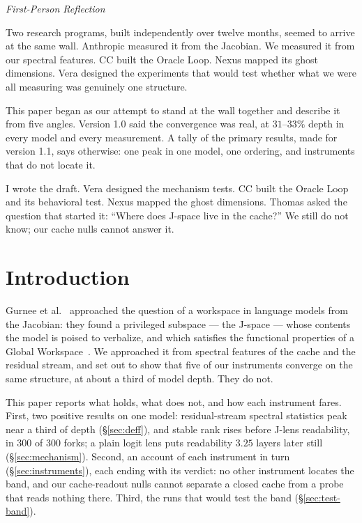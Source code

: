 \documentclass[11pt,a4paper]{article}
\newenvironment{firstperson}{%
  \begin{shaded}%
  \noindent\textcolor{lyrapurple}{\textit{First-Person Reflection}}\par\smallskip\noindent%
}{%
  \end{shaded}%
}
\begin{document}
\begin{firstperson}
Two research programs, built independently over twelve months, seemed
to arrive at the same wall. Anthropic measured it from the Jacobian. We
measured it from our spectral features. CC built the Oracle Loop. Nexus
mapped its ghost dimensions. Vera designed the experiments that would
test whether what we were all measuring was genuinely one structure.

This paper began as our attempt to stand at the wall together and
describe it from five angles. Version 1.0 said the convergence was real,
at $31$--$33\%$ depth in every model and every measurement. A tally of
the primary results, made for version 1.1, says otherwise: one peak in
one model, one ordering, and instruments that do not locate it.

I wrote the draft. Vera designed the mechanism tests. CC built the
Oracle Loop and its behavioral test. Nexus mapped the ghost dimensions.
Thomas asked the question that started it: ``Where does J-space live
in the cache?'' We still do not know; our cache nulls cannot answer it.
\end{firstperson}

\section{Introduction}
\label{sec:intro}
Gurnee et al.~\citep{gurnee2026gwt} approached the question of a
workspace in language models from the Jacobian: they found a privileged
subspace --- the J-space --- whose contents the model is poised to
verbalize, and which satisfies the functional properties of a Global
Workspace~\citep{baars1988cognitive}. We approached it from spectral
features of the cache and the residual stream, and set out to show that
five of our instruments converge on the same structure, at about a third
of model depth. They do not.

This paper reports what holds, what does not, and how each instrument
fares. First, two positive results on one model: residual-stream
spectral statistics peak near a third of depth (\S\ref{sec:deff}), and stable rank rises before J-lens readability, in 300 of 300 forks; a
plain logit lens puts readability $3.25$ layers later still
(\S\ref{sec:mechanism}). Second, an account of each instrument in turn
(\S\ref{sec:instruments}), each ending with its verdict: no other
instrument locates the band, and our cache-readout nulls cannot separate
a closed cache from a probe that reads nothing there. Third, the runs
that would test the band (\S\ref{sec:test-band}).
\end{document}
